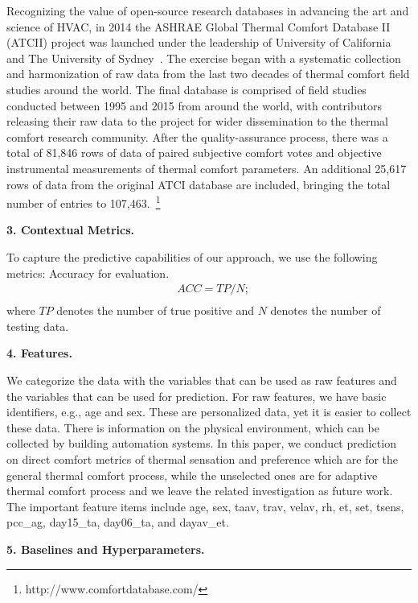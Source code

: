 Recognizing the value of open-source research databases in advancing the art and science of HVAC, in 2014 the ASHRAE Global Thermal Comfort Database II (ATCII) project was launched under the leadership of University of California and The University of Sydney~\cite{licina18}. The exercise began with a systematic collection and harmonization of raw data from the last two decades of thermal comfort field studies around the world. The final database is comprised of field studies conducted between 1995 and 2015 from around the world, with contributors releasing their raw data to the project for wider dissemination to the thermal comfort research community. After the quality-assurance process, there was a total of 81,846 rows of data of paired subjective comfort votes and objective instrumental measurements of thermal comfort parameters. An additional 25,617 rows of data from the original ATCI database are included, bringing the total number of entries to 107,463.~\footnote{http://www.comfortdatabase.com/}

\textbf{3. Contextual Metrics.} 

To capture the predictive capabilities of our approach, we use the following metrics: Accuracy for evaluation.
\noindent
\begin{equation*}
\begin{split}
&ACC = TP / N; \\
\end{split}
\end{equation*}
where $TP$ denotes the number of true positive and $N$ denotes the number of testing data. 

\textbf{4. Features.}

We categorize the data with the variables that can be used as raw features and the variables that can be used for prediction. For raw features, we have basic identifiers, e.g., age and sex. These are personalized data, yet it is easier to collect these data. There is information on the physical environment, which can be collected by building automation systems. In this paper, we conduct prediction on direct comfort metrics of thermal sensation and preference which are for the general thermal comfort process, while the unselected ones are for adaptive thermal comfort process and we leave the related investigation as future work. The important feature items include age, sex, taav, trav, velav, rh, et, set, tsens, pcc\_ag, day15\_ta, day06\_ta, and dayav\_et. 

\textbf{5. Baselines and Hyperparameters.}

